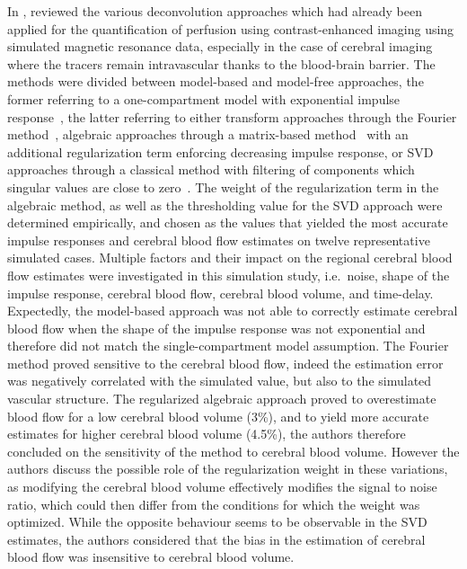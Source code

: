 In \citeyear{ostergaard:1996gt}, \citet{ostergaard:1996gt} reviewed the various deconvolution approaches which had already been applied for the quantification of perfusion using contrast-enhanced imaging using simulated magnetic resonance data, especially in the case of cerebral imaging where the tracers remain intravascular thanks to the blood-brain barrier.
The methods were divided between model-based and model-free approaches, the former referring to a one-compartment model with exponential impulse response~\cite{Faddy:1987kl}, the latter referring to either transform approaches through the Fourier method~\cite{Coulam:1966un}, algebraic approaches through a matrix-based method~\cite{Valentinuzzi:1975tr} with an additional regularization term enforcing decreasing impulse response, or SVD approaches through a classical method with filtering of components which singular values are close to zero~\cite{Diffey:1976tk}.
The weight of the regularization term in the algebraic method, as well as the thresholding value for the SVD approach were determined empirically, and chosen as the values that yielded the most accurate impulse responses and cerebral blood flow estimates on twelve representative simulated cases.
Multiple factors and their impact on the regional cerebral blood flow estimates were investigated in this simulation study, i.e.~noise, shape of the impulse response, cerebral blood flow, cerebral blood volume, and time-delay.
Expectedly, the model-based approach was not able to correctly estimate cerebral blood flow when the shape of the impulse response was not exponential and therefore did not match the single-compartment model assumption.
The Fourier method proved sensitive to the cerebral blood flow, indeed the estimation error was negatively correlated with the simulated value, but also to the simulated vascular structure.
The regularized algebraic approach proved to overestimate blood flow for a low cerebral blood volume (3\%), and to yield more accurate estimates for higher cerebral blood volume (4.5\%), the authors therefore concluded on the sensitivity of the method to cerebral blood volume.
However the authors discuss the possible role of the regularization weight in these variations, as modifying the cerebral blood volume effectively modifies the signal to noise ratio, which could then differ from the conditions for which the weight was optimized.
While the opposite behaviour seems to be observable in the SVD estimates, the authors considered that the bias in the estimation of cerebral blood flow was insensitive to cerebral blood volume. 
